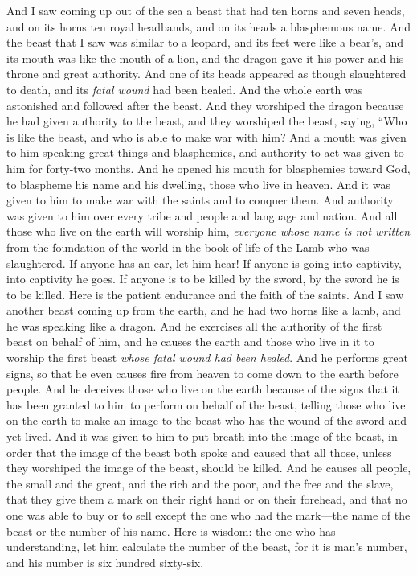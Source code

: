 \begin{biblechapter} %
 And I saw coming up out of the sea a beast that had ten horns and seven heads, and on its horns ten royal headbands, and on its heads a blasphemous name.
\verse And the beast that I saw was similar to a leopard, and its feet were like a bear’s, and its mouth was like the mouth of a lion, and the dragon gave it his power and his throne and great authority.
\verse And one of its heads appeared as though slaughtered to death, and its \textit{fatal wound} had been healed. And the whole earth was astonished and followed after the beast.
\verse And they worshiped the dragon because he had given authority to the beast, and they worshiped the beast, saying, “Who is like the beast, and who is able to make war with him?
\verse And a mouth was given to him speaking great things and blasphemies, and authority to act was given to him for forty-two months.
\verse And he opened his mouth for blasphemies toward God, to blaspheme his name and his dwelling, those who live in heaven.
\verse And it was given to him to make war with the saints and to conquer them. And authority was given to him over every tribe and people and language and nation.
\verse And all those who live on the earth will worship him, \textit{everyone whose name is not written} from the foundation of the world in the book of life of the Lamb who was slaughtered.
\verse If anyone has an ear, let him hear!
\verse If anyone is going into captivity, into captivity he goes. 
If anyone is to be killed by the sword, by the sword he is to be killed. Here is the patient endurance and the faith of the saints.
 And I saw another beast coming up from the earth, and he had two horns like a lamb, and he was speaking like a dragon.
\verse And he exercises all the authority of the first beast on behalf of him, and he causes the earth and those who live in it to worship the first beast \textit{whose fatal wound had been healed}.
\verse And he performs great signs, so that he even causes fire from heaven to come down to the earth before people.
\verse And he deceives those who live on the earth because of the signs that it has been granted to him to perform on behalf of the beast, telling those who live on the earth to make an image to the beast who has the wound of the sword and yet lived.
\verse And it was given to him to put breath into the image of the beast, in order that the image of the beast both spoke and caused that all those, unless they worshiped the image of the beast, should be killed.
\verse And he causes all people, the small and the great, and the rich and the poor, and the free and the slave, that they give them a mark on their right hand or on their forehead,
\verse and that no one was able to buy or to sell except the one who had the mark—the name of the beast or the number of his name.
\verse Here is wisdom: the one who has understanding, let him calculate the number of the beast, for it is man’s number, and his number is six hundred sixty-six.
\end{biblechapter}

